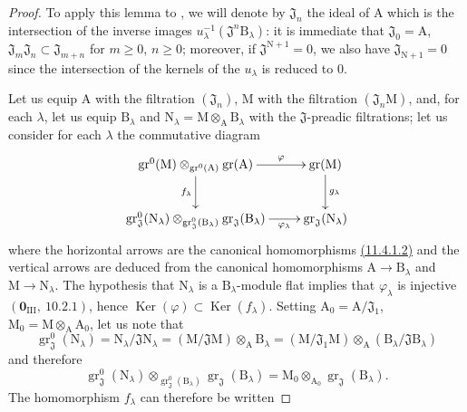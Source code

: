 \begin{proof}
To apply this lemma to , we will denote by $\mathfrak{J}_n$ the ideal of $\mathrm{A}$ which is the intersection
of the inverse images $u_\lambda^{-1}(\mathfrak{J}^n\mathrm{B}_\lambda)$: it is immediate that $\mathfrak{J}_0=\mathrm{A}$, $\mathfrak{J}_m\mathfrak{J}_n\subset\mathfrak{J}_{m+n}$
for $m\geq 0$, $n\geq 0$; moreover, if $\mathfrak{J}^{\mathrm{N}+1}=0$, we also have $\mathfrak{J}_{\mathrm{N}+1}=0$ since the intersection of the
kernels of the $u_\lambda$ is reduced to $0$.

Let us equip $\mathrm{A}$ with the filtration $(\mathfrak{J}_n)$, $\mathrm{M}$ with the filtration $(\mathfrak{J}_n\mathrm{M})$, and, for each $\lambda$,
let us equip $\mathrm{B}_\lambda$ and $\mathrm{N}_\lambda=\mathrm{M}\otimes_\mathrm{A}\mathrm{B}_\lambda$ with the $\mathfrak{J}$-preadic filtrations; let us consider for each $\lambda$ the
commutative diagram
\[
\xymatrix{
\operatorname{gr}^0(\mathrm{M})\otimes_{\operatorname{gr}^0(\mathrm{A})}\operatorname{gr}(\mathrm{A}) \ar[r]^-{\varphi} \ar[d]_{f_\lambda} & \operatorname{gr}(\mathrm{M}) \ar[d]^{g_\lambda} \\
\operatorname{gr}^0_\mathfrak{J}(\mathrm{N}_\lambda)\otimes_{\operatorname{gr}^0_\mathfrak{J}(\mathrm{B}_\lambda)}\operatorname{gr}_\mathfrak{J}(\mathrm{B}_\lambda) \ar[r]_-{\varphi_\lambda} & \operatorname{gr}_\mathfrak{J}(\mathrm{N}_\lambda)
}
\]
where the horizontal arrows are the canonical homomorphisms {\hyperref[IV.11.4.1.2]{(11.4.1.2)}} and the vertical
arrows are deduced from the canonical homomorphisms $\mathrm{A}\to\mathrm{B}_\lambda$ and $\mathrm{M}\to\mathrm{N}_\lambda$. The hypothesis
that $\mathrm{N}_\lambda$ is a $\mathrm{B}_\lambda$-module flat implies that $\varphi_\lambda$ is injective $(\mathbf{0}_{\mathrm{III}},~10.2.1)$, hence
$\operatorname{Ker}(\varphi)\subset\operatorname{Ker}(f_\lambda)$. Setting $\mathrm{A}_0=\mathrm{A}/\mathfrak{J}_1$, $\mathrm{M}_0=\mathrm{M}\otimes_\mathrm{A}\mathrm{A}_0$, let us note that
\[
\operatorname{gr}^0_\mathfrak{J}(\mathrm{N}_\lambda)=\mathrm{N}_\lambda/\mathfrak{J}\mathrm{N}_\lambda=(\mathrm{M}/\mathfrak{J}\mathrm{M})\otimes_\mathrm{A}\mathrm{B}_\lambda=(\mathrm{M}/\mathfrak{J}_1\mathrm{M})\otimes_{\mathrm{A}}(\mathrm{B}_\lambda/\mathfrak{J}\mathrm{B}_\lambda)
\]
and therefore
\[
\operatorname{gr}^0_\mathfrak{J}(\mathrm{N}_\lambda)\otimes_{\operatorname{gr}^0_\mathfrak{J}(\mathrm{B}_\lambda)}\operatorname{gr}_\mathfrak{J}(\mathrm{B}_\lambda)=\mathrm{M}_0\otimes_{\mathrm{A}_0}\operatorname{gr}_\mathfrak{J}(\mathrm{B}_\lambda).
\]
The homomorphism $f_\lambda$ can therefore be written

\end{proof}
